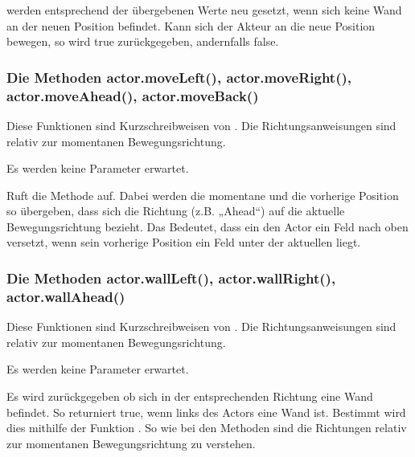 \documentclass[letterpaper,10pt,ngerman]{sphinxmanual}
\begin{document}

 werden entsprechend der übergebenen Werte neu
gesetzt, wenn sich keine Wand an der neuen Position befindet. Kann sich der
Akteur an die neue Position bewegen, so wird true zurückgegeben, andernfalls
false.


\subsubsection{Die Methoden actor.moveLeft(), actor.moveRight(), actor.moveAhead(), actor.moveBack()}
\label{\detokenize{programming:die-methoden-actor-moveleft-actor-moveright-actor-moveahead-actor-moveback}}
Diese Funktionen sind Kurzschreibweisen von . Die
Richtungsanweisungen sind relativ zur momentanen Bewegungsrichtung.


Es werden keine Parameter erwartet.


Ruft die Methode  auf. Dabei werden die momentane und die
vorherige Position so übergeben, dass sich die Richtung (z.B. „Ahead“) auf die
aktuelle Bewegungsrichtung bezieht. Das Bedeutet, dass ein 
den Actor ein Feld nach oben versetzt, wenn sein vorherige Position ein Feld
unter der aktuellen liegt.


\subsubsection{Die Methoden actor.wallLeft(), actor.wallRight(), actor.wallAhead()}
\label{\detokenize{programming:die-methoden-actor-wallleft-actor-wallright-actor-wallahead}}
Diese Funktionen sind Kurzschreibweisen von . Die
Richtungsanweisungen sind relativ zur momentanen Bewegungsrichtung.


Es werden keine Parameter erwartet.


Es wird zurückgegeben ob sich in der entsprechenden Richtung eine Wand
befindet. So returniert  true, wenn links des Actors eine
Wand ist. Bestimmt wird dies mithilfe der Funktion . So wie bei den
Methoden  sind die Richtungen relativ zur momentanen
Bewegungsrichtung zu verstehen.
\end{document}
